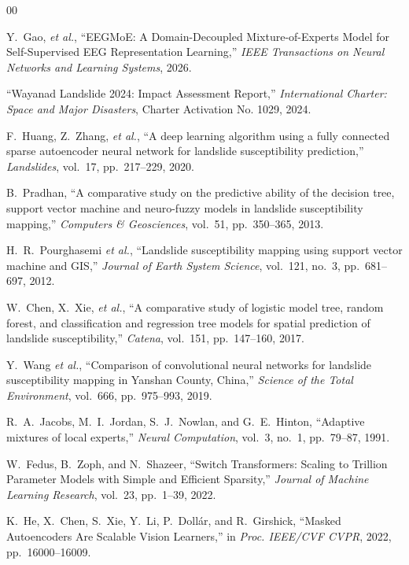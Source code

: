 \documentclass[conference]{IEEEtran}
\begin{document}
\begin{thebibliography}{00}

Y.~Gao, \textit{et al.}, ``EEGMoE: A Domain-Decoupled Mixture-of-Experts Model for Self-Supervised EEG Representation Learning,'' \textit{IEEE Transactions on Neural Networks and Learning Systems}, 2026.

``Wayanad Landslide 2024: Impact Assessment Report,'' \textit{International Charter: Space and Major Disasters}, Charter Activation No. 1029, 2024.

F.~Huang, Z.~Zhang, \textit{et al.}, ``A deep learning algorithm using a fully connected sparse autoencoder neural network for landslide susceptibility prediction,'' \textit{Landslides}, vol.~17, pp.~217--229, 2020.

B.~Pradhan, ``A comparative study on the predictive ability of the decision tree, support vector machine and neuro-fuzzy models in landslide susceptibility mapping,'' \textit{Computers \& Geosciences}, vol.~51, pp.~350--365, 2013.

H.~R.~Pourghasemi \textit{et al.}, ``Landslide susceptibility mapping using support vector machine and GIS,'' \textit{Journal of Earth System Science}, vol.~121, no.~3, pp.~681--697, 2012.

W.~Chen, X.~Xie, \textit{et al.}, ``A comparative study of logistic model tree, random forest, and classification and regression tree models for spatial prediction of landslide susceptibility,'' \textit{Catena}, vol.~151, pp.~147--160, 2017.

Y.~Wang \textit{et al.}, ``Comparison of convolutional neural networks for landslide susceptibility mapping in Yanshan County, China,'' \textit{Science of the Total Environment}, vol.~666, pp.~975--993, 2019.

R.~A.~Jacobs, M.~I.~Jordan, S.~J.~Nowlan, and G.~E.~Hinton, ``Adaptive mixtures of local experts,'' \textit{Neural Computation}, vol.~3, no.~1, pp.~79--87, 1991.

W.~Fedus, B.~Zoph, and N.~Shazeer, ``Switch Transformers: Scaling to Trillion Parameter Models with Simple and Efficient Sparsity,'' \textit{Journal of Machine Learning Research}, vol.~23, pp.~1--39, 2022.

K.~He, X.~Chen, S.~Xie, Y.~Li, P.~Doll{\'a}r, and R.~Girshick, ``Masked Autoencoders Are Scalable Vision Learners,'' in \textit{Proc. IEEE/CVF CVPR}, 2022, pp.~16000--16009.

\end{thebibliography}
\end{document}
